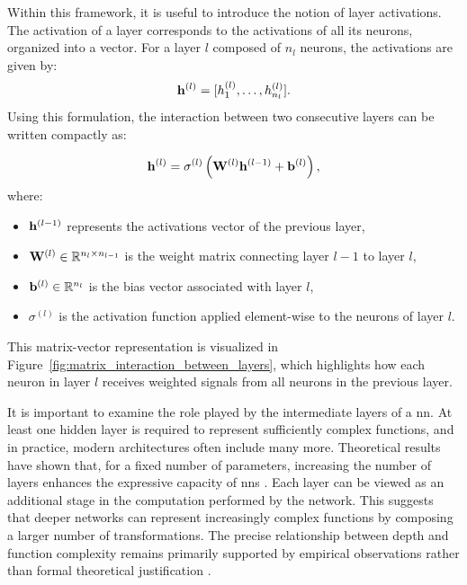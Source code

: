Within this framework, it is useful to introduce the notion of layer activations.
The activation of a layer corresponds to the activations of all its neurons, organized into a vector.
For a layer $l$ composed of $n_l$ neurons, the activations are given by:
\begin{equation}
\latentRepresentation[l] = [h_1^{(l)}, \dots, h_{n_l}^{(l)}].
\label{eq:layer_activation_vector}
\end{equation}
Using this formulation, the interaction between two consecutive layers can be written compactly as:
\begin{equationwhere}
\begin{equation}
\latentRepresentation[l] = \sigma^{(l)}\left(\mat{W}^{(l)} \latentRepresentation[l-1] + \vect{b}^{(l)}\right),
\label{eq:layer_interaction}
\end{equation}
where:
\begin{itemize}
\item $\latentRepresentation[l-1]$ represents the activations vector of the previous layer,
\item $\mathbf{W}^{(l)} \in \mathbb{R}^{n_l \times n_{l-1}}$ is the weight matrix connecting layer $l-1$ to layer $l$,
\item $\mathbf{b}^{(l)} \in \mathbb{R}^{n_l}$ is the bias vector associated with layer $l$,
\item $\sigma^{(l)}$ is the activation function applied element-wise to the neurons of layer $l$.
\end{itemize}
\end{equationwhere}

This matrix-vector representation is visualized in Figure~\ref{fig:matrix_interaction_between_layers}, which highlights how each neuron in layer $l$ receives weighted signals from all neurons in the previous layer.



It is important to examine the role played by the intermediate layers of a \gls{nn}.
At least one hidden layer is required to represent sufficiently complex functions, and in practice, modern architectures often include many more.
Theoretical results have shown that, for a fixed number of parameters, increasing the number of layers enhances the expressive capacity of \glspl{nn} \parencite{telgarsky2016benefits}.
Each layer can be viewed as an additional stage in the computation performed by the network.
This suggests that deeper networks can represent increasingly complex functions by composing a larger number of transformations.
The precise relationship between depth and function complexity remains primarily supported by empirical observations rather than formal theoretical justification \parencite{goodfellow2016deep}.

